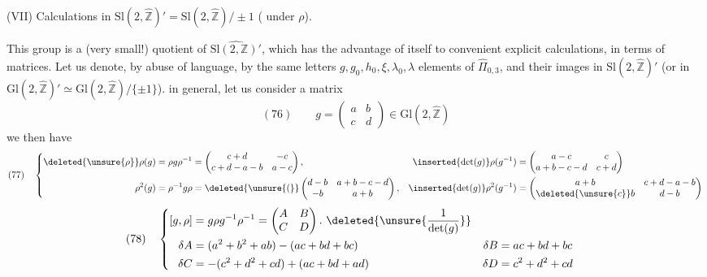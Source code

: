 
(VII) Calculations in $\mathrm{Sl}(2,\widehat{\mathbb Z})'=\mathrm{Sl}(2,\widehat{\mathbb Z})/\pm1$
( under $\rho$).


This group is a (very small!) quotient of $\widehat{\mathrm{Sl}(2,\mathbb Z)'}$, which has the advantage of  itself to convenient explicit  calculations, in terms of matrices. Let us denote, by abuse of language, by the same letters $g,g_0,h_0,\xi,\lambda_0,\lambda$ elements of  $\widehat{\Pi}_{0,3}$,  and their images in  $\mathrm{Sl}(2,\widehat{\mathbb Z})'$  (or in $\mathrm{Gl}(2,\widehat{\mathbb Z})'\simeq\mathrm{Gl}(2,\widehat{\mathbb Z})/\{\pm1\}$).   in general, let us consider a matrix
\[
(76)\qquad g=\begin{pmatrix}a&b\\c&d\end{pmatrix}\in\mathrm{Gl}(2,\widehat{\mathbb Z})
\]
we then have
\[
(77)\quad
\left\{\begin{aligned}
\deleted{\unsure{\rho}}\rho(g)&=\rho g\rho^{-1}=\begin{pmatrix}c+d&-c\\c+d-a-b&a-c\end{pmatrix},
&\inserted{\det(g)}\rho(g^{-1})&=\begin{pmatrix}a-c&c\\a+b-c-d&c+d\end{pmatrix}\\
\rho^2(g)&=\rho^{-1}g\rho=\deleted{\unsure{(}}\begin{pmatrix}d-b&a+b-c-d\\-b&a+b\end{pmatrix},
&\inserted{\det(g)}\rho^2(g^{-1})&=\begin{pmatrix}a+b&c+d-a-b\\\deleted{\unsure{c}}b&d-b\end{pmatrix}
\end{aligned}\right.
\]
\[
(78)\quad
\left\{\begin{aligned}
\relax[g,\rho]&=g\rho g^{-1}\rho^{-1}=\begin{pmatrix}A&B\\C&D\end{pmatrix}.\ \deleted{\unsure{\frac{1}{\det(g)}}}\\
\delta A&=(a^2+b^2+ab)-(ac+bd+bc)&\delta B&=ac+bd+bc\\
\delta C&=-(c^2+d^2+cd)+(ac+bd+ad)&\delta D&=c^2+d^2+cd
\end{aligned}\right.
\]

